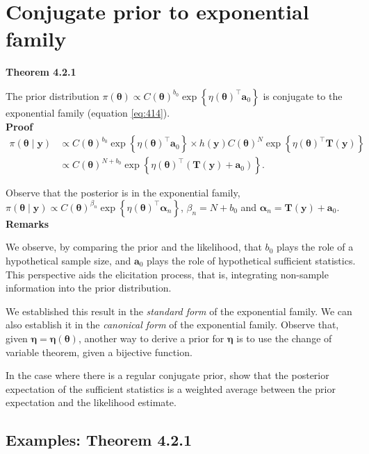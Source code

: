 \section{Conjugate prior to exponential family}\label{sec42}

\textbf{Theorem 4.2.1}

The prior distribution $\pi(\bm{\theta})\propto C(\bm{\theta})^{b_0}\exp\left\{\eta(\bm{\theta})^{\top}\bm{a}_0\right\}$ is conjugate to the exponential family (equation \ref{eq:414}).\\

\textbf{Proof}
\begin{align}
	\pi(\bm{\theta}\mid \bm{y})& \propto C(\bm{\theta})^{b_0}\exp\left\{\eta(\bm{\theta})^{\top}\bm{a}_0\right\} \times h(\bm{y}) C(\bm{\theta})^N\exp\left\{\eta(\bm{\theta})^{\top}\bm{T}(\bm{y})\right\}\nonumber\\
	& \propto C(\bm{\theta})^{N+b_0} \exp\left\{\eta(\bm{\theta})^{\top}(\bm{T}(\bm{y})+\bm{a}_0)\right\}.\nonumber 
\end{align}

Observe that the posterior is in the exponential family, $\pi(\bm{\theta}\mid \bm{y})\propto C(\bm{\theta})^{\beta_n} \exp\left\{\eta(\bm{\theta})^{\top}\bm{\alpha}_n\right\}$, $\beta_n=N+b_0$ and $\bm{\alpha}_n=\bm{T}(\bm{y})+\bm{a}_0$.\\

\textbf{Remarks}

We observe, by comparing the prior and the likelihood, that \( b_0 \) plays the role of a hypothetical sample size, and \( \bm{a}_0 \) plays the role of hypothetical sufficient statistics. This perspective aids the elicitation process, that is, integrating non-sample information into the prior distribution.

We established this result in the \textit{standard form} of the exponential family. We can also establish it in the \textit{canonical form} of the exponential family. Observe that, given \( \bm{\eta} = \bm{\eta}(\bm{\theta}) \), another way to derive a prior for \( \bm{\eta} \) is to use the change of variable theorem, given a bijective function.

In the case where there is a regular conjugate prior, \cite{diaconis1979conjugate} show that the posterior expectation of the sufficient statistics is a weighted average between the prior expectation and the likelihood estimate.

\subsection{Examples: Theorem 4.2.1}\label{sec421}

